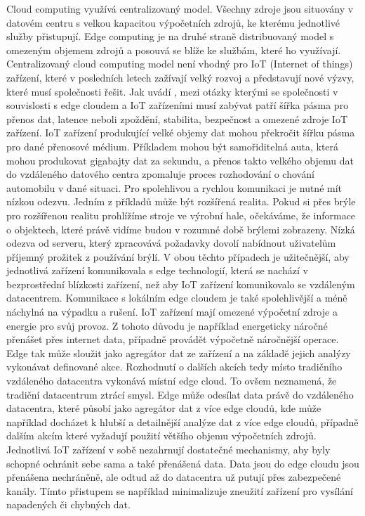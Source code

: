  Cloud computing využívá centralizovaný model. Všechny zdroje jsou situovány v datovém centru s velkou kapacitou výpočetních zdrojů, ke kterému jednotlivé služby přistupují. Edge computing je na druhé straně distribuovaný model s omezeným objemem zdrojů a posouvá se blíže ke službám, které ho využívají. Centralizovaný cloud computing model není vhodný pro IoT (Internet of things) zařízení, které v posledních letech zažívají velký rozvoj a představují nové výzvy, které musí společnosti řešit. Jak uvádí \cite{buyya}, mezi otázky kterými se společnosti v souvislosti s edge cloudem a IoT zařízeními musí zabývat patří šířka pásma pro přenos dat, latence neboli zpoždění, stabilita, bezpečnost a omezené zdroje IoT zařízení. IoT zařízení produkující velké objemy dat mohou překročit šířku pásma pro dané přenosové médium. Příkladem mohou být \linebreak samořiditelná auta, která mohou produkovat gigabajty dat za sekundu, a přenos takto velkého objemu dat do vzdáleného datového centra zpomaluje proces rozhodování o chování automobilu v dané situaci. Pro spolehlivou a rychlou komunikaci je nutné mít nízkou odezvu. Jedním z příkladů může být rozšířená realita. Pokud si přes brýle pro rozšířenou realitu prohlížíme stroje ve výrobní hale, očekáváme, že informace o objektech, které právě vidíme budou v rozumné době brýlemi zobrazeny. Nízká odezva od serveru, který zpracovává požadavky dovolí nabídnout uživatelům příjemný prožitek z používání brýlí. V obou těchto případech je užitečnější, aby jednotlivá zařízení komunikovala s edge technologií, která se nachází v bezprostřední blízkosti zařízení, než aby IoT zařízení komunikovalo se vzdáleným datacentrem. Komunikace s lokálním edge cloudem je také spolehlivější a méně náchylná na výpadku a rušení. IoT zařízení mají omezené výpočetní zdroje a energie pro svůj provoz. Z tohoto důvodu je například energeticky náročné přenášet přes internet data, případně provádět výpočetně náročnější operace. Edge tak může sloužit jako agregátor dat ze zařízení a na základě jejich analýzy vykonávat definované akce. Rozhodnutí o dalších akcích tedy místo tradičního vzdáleného datacentra vykonává místní edge cloud. To ovšem neznamená, že tradiční datacentrum ztrácí smysl. Edge může odesílat data právě do vzdáleného datacentra, které působí jako agregátor dat z více edge cloudů, kde může například docházet k hlubší a detailnější analýze dat z více edge cloudů, případně dalším akcím které vyžadují použití většího objemu výpočetních zdrojů. Jednotlivá IoT zařízení v sobě nezahrnují dostatečné mechanismy, aby byly schopné ochránit sebe sama a také přenášená data. Data jsou do edge cloudu jsou přenášena nechráněně, ale odtud až do datacentra už putují přes zabezpečené kanály. Tímto přistupem se například minimalizuje zneužití zařízení pro vysílání napadených či chybných dat. \par
